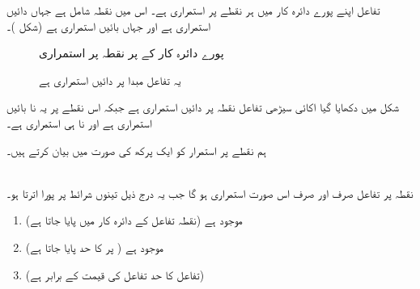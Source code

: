 تفاعل  اپنے پورے دائرہ کار  میں ہر نقطے پر استمراری ہے۔ اس میں نقطہ  شامل ہے جہاں  دائیں استمراری ہے اور  جہاں  بائیں استمراری ہے (شکل )۔ 
\begin{figure}
\centering
\begin{minipage}{0.45\textwidth}
\centering
{}
\caption{پورے دائرہ کار کے پر نقطہ پر استمراری}
\label{شکل_حد_استمراری_تفاعل}
\end{minipage}\hfill
\begin{minipage}{0.45\textwidth}
\centering
{}
\caption{یہ تفاعل مبدا پر دائیں استمراری ہے}
\label{شکل_حد_دائیں _استمراری_تفاعل}
\end{minipage}%
\end{figure}

شکل  میں دکھایا گیا اکائی سیڑھی تفاعل   نقطہ  پر دائیں استمراری ہے جبکہ اس نقطے پر یہ نا بائیں استمراری ہے اور نا ہی استمراری ہے۔ 

ہم نقطے پر استمرار کو ایک پرکھ کی صورت میں بیان کرتے ہیں۔

\\
نقطہ  پر تفاعل  صرف اور صرف اس صورت استمراری ہو گا جب یہ درج ذیل تینوں شرائط پر پورا اترتا ہو۔
\begin{enumerate}[1.]
\item
{} موجود ہے \quad \quad (نقطہ  تفاعل  کے دائرہ کار میں  پایا جاتا ہے)
\item
{} موجود ہے \quad \quad  ( پر  کا حد پایا جاتا ہے)
\item
{} 
\quad \quad 
 (تفاعل کا حد تفاعل کی قیمت کے برابر ہے)
\end{enumerate}

